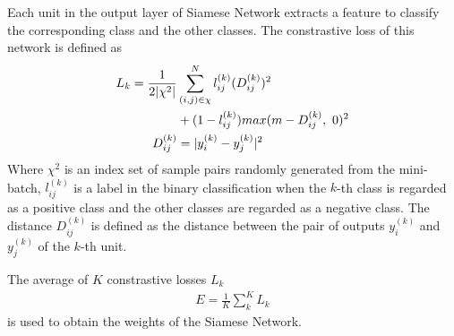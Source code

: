 \documentclass[twocolumn,10pt]{article}
\begin{document}
Each unit in the output layer of Siamese Network extracts a feature to classify the corresponding class and the other classes.
The constrastive loss of this network is defined as
\begin{align} \label{eq:multi contrastive}
L_k=\frac{1}{2|\chi^2|}&\sum_{(i,j) \in \chi}^N l_{ij}^{(k)}(D^{(k)}_{ij})^2 \notag \\
&+ (1-l_{ij}^{(k)})max(m-D^{(k)}_{ij}, ~0)^2 \\
D^{(k)}_{ij}&=|y^{(k)}_{i}- y^{(k)}_{j}|^2
\end{align}
Where $\chi^2$ is an index set of sample pairs randomly generated from the mini-batch, $l^{(k)}_{ij}$ is a label in the binary classification when the $k$-th class is regarded as a positive class and the other classes are regarded as a negative class.
The distance $D^{(k)}_{ij}$ is defined as the distance between the pair of outputs $y_i^{(k)}$ and $y_j^{(k)}$ of the $k$-th unit.

The average of $K$ constrastive losses $L_k$  
\begin{align} \label{eq:ave contrastive}
E = \frac{1}{K}\sum_{k}^{K}L_k
\end{align}
is used to obtain the weights of the Siamese Network.
\end{document}
